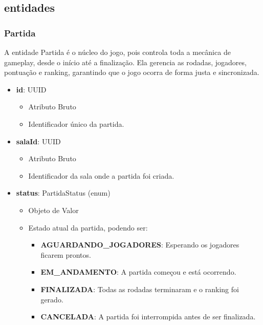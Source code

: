 \subsection{entidades}
    \subsubsection{Partida}
    A entidade Partida é o núcleo do jogo, pois controla toda a mecânica de gameplay, desde o início até a finalização. Ela gerencia as rodadas, jogadores, pontuação e ranking, garantindo que o jogo ocorra de forma justa e sincronizada.
    \begin{itemize}
        \item \textbf{id}: UUID  
            \begin{itemize}
                \item Atributo Bruto
                \item Identificador único da partida.
            \end{itemize}

        \item \textbf{salaId}: UUID  
            \begin{itemize}
                \item Atributo Bruto
                \item Identificador da sala onde a partida foi criada.
            \end{itemize}

        \item \textbf{status}: PartidaStatus (enum)  
            \begin{itemize}
                \item Objeto de Valor
                \item Estado atual da partida, podendo ser:
                \begin{itemize}
                    \item \textbf{AGUARDANDO\_JOGADORES}: Esperando os jogadores ficarem prontos.
                    \item \textbf{EM\_ANDAMENTO}: A partida começou e está ocorrendo.
                    \item \textbf{FINALIZADA}: Todas as rodadas terminaram e o ranking foi gerado.
                    \item \textbf{CANCELADA}: A partida foi interrompida antes de ser finalizada.
                \end{itemize}
            \end{itemize}


\end{itemize}

